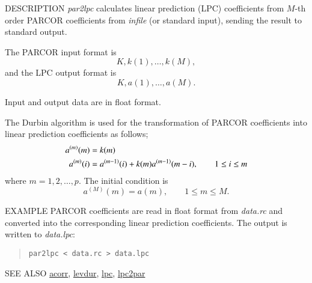 \begin{synopsis}
\item [par2lpc] [ --m $M$ ] [ {\em infile} ] 
\end{synopsis}

\begin{qsection}{DESCRIPTION}
{\em par2lpc} calculates linear prediction (LPC) coefficients 
from $M$-th order PARCOR coefficients from {\em infile} (or standard input), 
sending the result to standard output.

The PARCOR input format is
\begin{displaymath}
  K, k(1),\dots, k(M), 
\end{displaymath}
and the LPC output format is
\begin{displaymath}
  K, a(1),\dots, a(M).
\end{displaymath}

Input and output data are in float format.

The Durbin algorithm is used for the transformation
of PARCOR coefficients into
linear prediction coefficients as follows;
\begin{align} 
a^{(m)}(m) &= k(m) \notag \\
a^{(m)}(i) &= a^{(m-1)}(i) + k(m) a^{(m-1)}(m-i), \qquad 1\leq i \leq m \notag
\end{align}
where  $m=1, 2, \dots, p$.
The initial condition is 
\begin{displaymath}
a^{(M)}(m) = a(m), \qquad 1 \leq m \leq M.
\end{displaymath}
\end{qsection}

\begin{options}
\end{options}

\begin{qsection}{EXAMPLE}
PARCOR coefficients are read in float format from {\em data.rc}
and converted into the corresponding linear prediction coefficients.
The output is written to {\em data.lpc}:
\begin{quote}
 \verb!par2lpc < data.rc > data.lpc!
\end{quote} 
\end{qsection}

\begin{qsection}{SEE ALSO}
\hyperlink{acorr}{acorr},
\hyperlink{levdur}{levdur},
\hyperlink{lpc}{lpc},
\hyperlink{lpc2par}{lpc2par}
\end{qsection}
